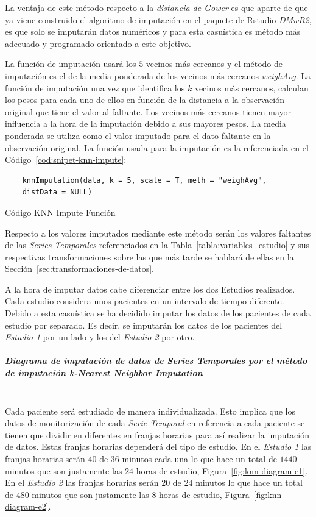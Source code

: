 La ventaja de este método respecto a la \textit{distancia de Gower} es que aparte de que ya viene construido el algoritmo de imputación en el paquete de Rstudio \textit{DMwR2}, es que solo se imputarán datos numéricos y para esta casuística es método más adecuado y programado orientado a este objetivo.

La función de imputación usará los $5$ vecinos más cercanos y el método de imputación es el de la media ponderada de los vecinos más cercanos \textit{weighAvg}. La función de imputación una vez que identifica los $k$ vecinos más cercanos, calculan los pesos para cada uno de ellos en función de la distancia a la observación original que tiene el valor al faltante. Los vecinos más cercanos tienen mayor influencia a la hora de la imputación debido a sus mayores pesos. La media ponderada se utiliza como el valor imputado para el dato faltante en la observación original. La función usada para la imputación es la referenciada en el Código~\ref{cod:snipet-knn-impute}:

\begin{code}[H]
\begin{lstlisting}
    knnImputation(data, k = 5, scale = T, meth = "weighAvg",
    distData = NULL)
\end{lstlisting}
\caption{Código KNN Impute Función}
\label{cod:snipet-knn-impute}
\end{code}

Respecto a los valores imputados mediante este método serán los valores faltantes de las \textit{Series Temporales} referenciados en la Tabla~\ref{tabla:variables_estudio} y sus respectivas transformaciones sobre las que más tarde se hablará de ellas en la Sección~\ref{sec:transformaciones-de-datos}. 

A la hora de imputar datos cabe diferenciar entre los dos Estudios realizados. Cada estudio considera unos pacientes en un intervalo de tiempo diferente. Debido a esta casuística se ha decidido imputar los datos de los pacientes de cada estudio por separado. Es decir, se imputarán los datos de los pacientes del \textit{Estudio 1} por un lado y los del \textit{Estudio 2} por otro.

\subparagraph*{Diagrama de imputación de datos de \textit{Series Temporales} por el método de imputación \textit{k-Nearest Neighbor Imputation}}\label{sec:diagrama-imputacion-knn} \\

Cada paciente será estudiado de manera individualizada. Esto implica que los datos de monitorización de cada \textit{Serie Temporal} en referencia a cada paciente se tienen que dividir en diferentes en franjas horarias para así realizar la imputación de datos. Estas franjas horarias dependerá del tipo de estudio. En el \textit{Estudio 1} las franjas horarias serán $40$ de $36$ minutos cada una lo que hace un total de $1440$ minutos que son justamente las $24$ horas de estudio, Figura~\ref{fig:knn-diagram-e1}. En el \textit{Estudio 2} las franjas horarias serán $20$ de $24$ minutos lo que hace un total de $480$ minutos que son justamente las $8$ horas de estudio, Figura~\ref{fig:knn-diagram-e2}.

